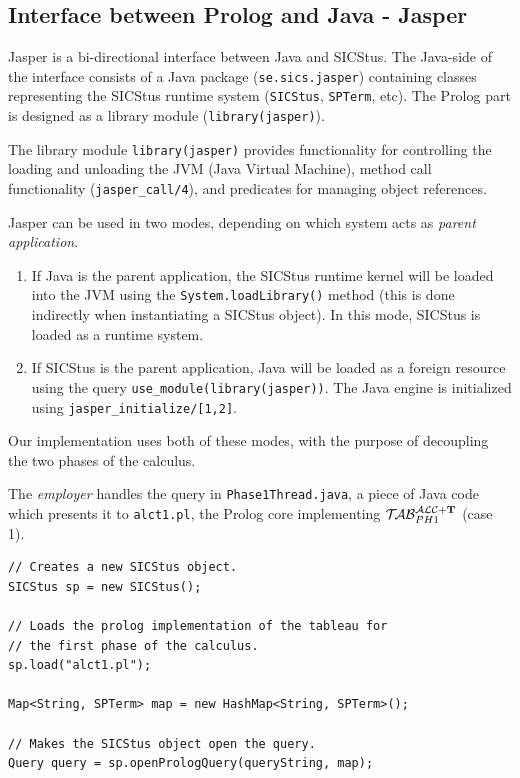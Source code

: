 \documentclass[a4paper, 11pt, oneside]{duthesis}
\newcommand{\tip}{{\bf T}}
\newcommand{\primo}{\mathrel{{\mathcal{T}\!\mathcal{AB}}}_{PH 1}^{\mathcal{ALC}+\mbox{\scriptsize $\tip$}}}
\begin{document}

\subsection{Interface between Prolog and Java - Jasper}\label{ssec_jasper}

Jasper is a bi-directional interface between Java and SICStus. The Java-side of the interface consists of a Java package (\verb$se.sics.jasper$) containing classes representing the SICStus runtime system (\verb$SICStus$, \verb$SPTerm$, etc). The Prolog part is designed as a library module (\verb$library(jasper)$).

The library module \verb$library(jasper)$  provides functionality for controlling the loading and unloading the JVM (Java Virtual Machine), method call functionality (\verb$jasper_call/4$), and predicates for managing object references.

Jasper can be used in two modes, depending on which system acts as \emph{parent application}.
\begin{enumerate}
\item If Java is the parent application, the SICStus runtime kernel will be loaded into the JVM using the \verb$System.loadLibrary()$ method (this is done indirectly when instantiating a SICStus object). In this mode, SICStus is loaded as a runtime system.

\item If SICStus is the parent application, Java will be loaded as a foreign resource using the query \verb$use_module(library(jasper))$. The Java engine is initialized using \verb$jasper_initialize/[1,2]$\cite{sicstus_jasper}.\\
\end{enumerate}

Our implementation uses both of these modes, with the purpose of decoupling the two phases of the calculus.

\newpage

The \emph{employer} handles the query in \verb$Phase1Thread.java$, a piece of Java code which presents it to \verb$alct1.pl$, the Prolog core implementing $\primo$ (case 1).

\begin{lstlisting}[caption={Phase1Thread.java}, label={lst:phase1t}, firstnumber=27]
// Creates a new SICStus object.
SICStus sp = new SICStus();
	
// Loads the prolog implementation of the tableau for
// the first phase of the calculus.
sp.load("alct1.pl");
	
Map<String, SPTerm> map = new HashMap<String, SPTerm>();
	
// Makes the SICStus object open the query.
Query query = sp.openPrologQuery(queryString, map);
\end{lstlisting}\vspace{0.5cm}
\end{document}

